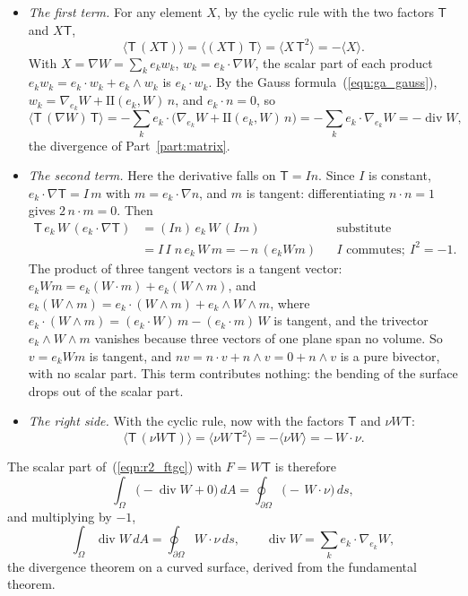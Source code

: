 \begin{itemize}
\item \emph{The first term.} For any element $X$, by the cyclic rule with the two factors $\mathsf T$ and $X\mathsf T$,
\begin{equation*}
\langle\mathsf T\,(X\mathsf T)\rangle = \langle (X\mathsf T)\,\mathsf T\rangle = \langle X\,\mathsf T^2\rangle = -\langle X\rangle .
\end{equation*}
With $X = \nabla W = \sum_k e_k w_k$, $w_k = e_k\cdot\nabla W$, the scalar part of each product $e_kw_k = e_k\cdot w_k + e_k\wedge w_k$ is $e_k\cdot w_k$. By the Gauss formula~(\ref{eqn:ga_gauss}), $w_k = \nabla_{e_k}W + \mathrm{II}(e_k, W)\, n$, and $e_k\cdot n = 0$, so
\begin{equation*}
\langle\mathsf T\,(\nabla W)\,\mathsf T\rangle = -\sum_k e_k\cdot\big(\nabla_{e_k}W + \mathrm{II}(e_k, W)\,n\big) = -\sum_k e_k\cdot\nabla_{e_k}W = -\operatorname{div}W ,
\end{equation*}
the divergence of Part~\ref{part:matrix}.
\item \emph{The second term.} Here the derivative falls on $\mathsf T = In$. Since $I$ is constant, $e_k\cdot\nabla\mathsf T = I\,m$ with $m = e_k\cdot\nabla n$, and $m$ is tangent: differentiating $n\cdot n = 1$ gives $2\, n\cdot m = 0$. Then
\begin{align*}
\mathsf T\, e_k\, W\,(e_k\cdot\nabla\mathsf T) &= (I n)\, e_k\, W\, (I m) && \text{substitute} \\
&= I\,I\; n\, e_k\, W\, m = -\, n\,(e_k W m) && I \text{ commutes};\ I^2 = -1 .
\end{align*}
The product of three tangent vectors is a tangent vector: $e_kWm = e_k(W\cdot m) + e_k(W\wedge m)$, and $e_k(W\wedge m) = e_k\cdot(W\wedge m) + e_k\wedge W\wedge m$, where $e_k\cdot(W\wedge m) = (e_k\cdot W)\, m - (e_k\cdot m)\, W$ is tangent, and the trivector $e_k\wedge W\wedge m$ vanishes because three vectors of one plane span no volume. So $v = e_kWm$ is tangent, and $n v = n\cdot v + n\wedge v = 0 + n\wedge v$ is a pure bivector, with no scalar part. This term contributes nothing: the bending of the surface drops out of the scalar part.
\item \emph{The right side.} With the cyclic rule, now with the factors $\mathsf T$ and $\nu W\mathsf T$:
\begin{equation*}
\langle\mathsf T\,(\nu W\mathsf T)\rangle = \langle\nu W\,\mathsf T^2\rangle = -\langle\nu W\rangle = -\,W\cdot\nu .
\end{equation*}
\end{itemize}
The scalar part of~(\ref{eqn:r2_ftgc}) with $F = W\mathsf T$ is therefore
\begin{equation*}
\int_\Omega \big(-\operatorname{div}W + 0\big)\, dA = \oint_{\partial\Omega} \big(-\,W\cdot\nu\big)\, ds ,
\end{equation*}
and multiplying by $-1$,
\begin{equation}
\label{eqn:r2_div}
\int_\Omega \operatorname{div} W\, dA = \oint_{\partial\Omega} W\cdot\nu\, ds, \qquad \operatorname{div}W = \sum_k e_k\cdot\nabla_{e_k}W ,
\end{equation}
the divergence theorem on a curved surface, derived from the fundamental theorem.

